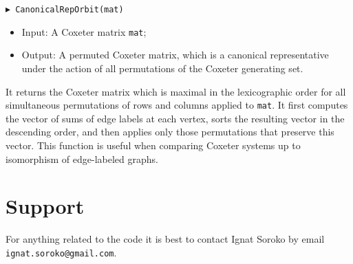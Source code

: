 \documentclass[10pt]{amsart}
\begin{document}
\bigskip\noindent
{\tt $\blacktriangleright$ CanonicalRepOrbit(mat)}
\noindent 
\begin{itemize}
\item{} Input: A Coxeter matrix {\tt mat};
\item{} Output: A permuted Coxeter matrix, which is a canonical representative under the action of all permutations of the Coxeter generating set. 
\end{itemize}
\noindent It returns the Coxeter matrix which is maximal in the lexicographic order for all simultaneous permutations of rows and columns applied to {\tt mat}. It first computes the vector of sums of edge labels at each vertex, sorts the resulting vector in the descending order, and then applies only those permutations that preserve this vector. This function is useful when comparing Coxeter systems up to isomorphism of edge-labeled graphs. 



\bigskip\bigskip
\section{Support}
\noindent
For anything related to the code it is best to contact Ignat Soroko by email {\tt ignat.soroko@gmail.com}.
\end{document}
